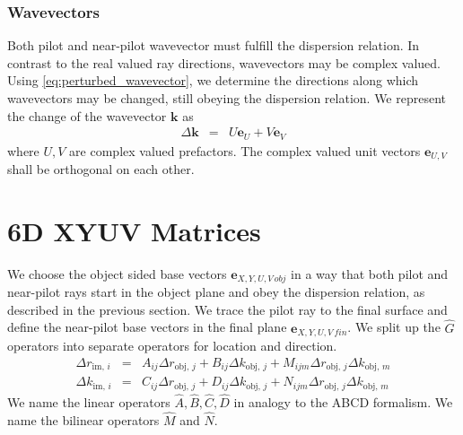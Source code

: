 \documentclass[12pt,a4paper,twoside,openright,BCOR10mm,headsepline,titlepage,abstracton,chapterprefix,final]{scrreprt}
\newcommand\Vector[1]{{\mathbf{#1}}}
\newcommand\wavenumber{k}
\newcommand\Wavevector{\Vector{\wavenumber}}
\newcommand\im{\textrm{im}}
\newcommand\obj{\textrm{obj}}
\begin{document}
\subsubsection{Wavevectors}
Both pilot and near-pilot wavevector must fulfill the dispersion relation. 
In contrast to the real valued ray directions, wavevectors may be complex valued.
Using \eqref{eq:perturbed_wavevector}, we determine the directions 
along which wavevectors may be changed, still obeying the dispersion relation.
We represent the change of the wavevector $\Wavevector$ as
\begin{eqnarray}
 \Delta \Wavevector &=& U \Vector{e}_U + V \Vector{e}_V
\end{eqnarray}
where $U,V$ are complex valued prefactors.
The complex valued unit vectors $\Vector{e}_{U,V}$ shall be orthogonal on each other.

\section{6D XYUV Matrices}
We choose the object sided base vectors 
$\Vector{e}_{X,Y,U,V\,obj}$ 
in a way that both pilot and near-pilot rays start in the object plane and obey the dispersion relation, 
as described in the previous section.
We trace the pilot ray to the final surface 
and define the near-pilot base vectors in the final plane
$\Vector{e}_{X,Y,U,V\,fin}$.
We split up the $\hat{G}$ operators into separate operators for location and direction.
\begin{eqnarray}
 \Delta r_{\im,\,i}  &=& A_{ij} \Delta r_{\obj,\,j} + B_{ij} \Delta k_{\obj,\,j} + M_{ijm} \Delta r_{\obj,\,j} \Delta k_{\obj,\,m} \\ 
 \Delta \wavenumber_{\im,\,i} &=& C_{ij} \Delta r_{\obj,\,j} + D_{ij} \Delta k_{\obj,\,j} + N_{ijm} \Delta r_{\obj,\,j} \Delta k_{\obj,\,m}
\end{eqnarray}
We name the linear operators $\hat{A}, \hat{B}, \hat{C}, \hat{D}$ in analogy to the ABCD formalism.
We name the bilinear operators $\hat{M}$ and $\hat{N}$.
\end{document}
